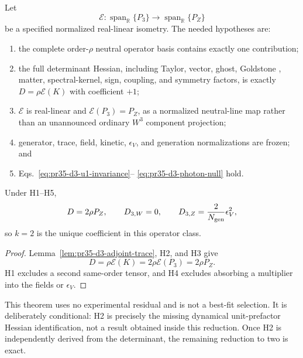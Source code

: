 Let
\begin{equation}
 \mathcal E:\operatorname{span}_{\mathbb R}\{P_3\}
 \longrightarrow\operatorname{span}_{\mathbb R}\{P_Z\}
\end{equation}
be a specified normalized real-linear isometry.  The needed hypotheses are:
\begin{enumerate}[label=\textnormal{H\arabic*.},leftmargin=2.8em]
 \item the complete order-$\rho$ neutral operator basis contains exactly one
 contribution;
 \item the full determinant Hessian, including Taylor, vector, ghost,
 Goldstone \cite{PeskinSchroeder_1995}, matter, spectral-kernel, sign, coupling, and symmetry factors, is
 exactly $D=\rho\mathcal E(K)$ with coefficient $+1$;
 \item $\mathcal E$ is real-linear and $\mathcal E(P_3)=P_Z$, as a normalized
 neutral-line map rather than an unannounced ordinary $W^3$ component
 projection;
 \item generator, trace, field, kinetic, $\epsilon_V$, and generation
 normalizations are frozen; and
 \item Eqs.~\eqref{eq:pr35-d3-u1-invariance}--
 \eqref{eq:pr35-d3-photon-null} hold.
\end{enumerate}

\begin{theorem}
\label{thm:pr35-d3-conditional-uniqueness}
Under H1--H5,
\begin{equation}
 D=2\rho P_Z,\qquad
 D_{3,W}=0,\qquad
 D_{3,Z}=\frac{2}{N_{\rm gen}}\epsilon_V^2,
 \label{eq:pr35-d3-unique-canonical-result}
\end{equation}
so $k=2$ is the unique coefficient in this operator class.
\end{theorem}

\begin{proof}
Lemma~\ref{lem:pr35-d3-adjoint-trace}, H2, and H3 give
\begin{equation}
 D=\rho\mathcal E(K)=2\rho\mathcal E(P_3)=2\rho P_Z.
\end{equation}
H1 excludes a second same-order tensor, and H4 excludes absorbing a multiplier
into the fields or $\epsilon_V$.
\end{proof}

This theorem uses no experimental residual and is not a best-fit selection.
It is deliberately conditional: H2 is precisely the missing dynamical
unit-prefactor Hessian identification, not a result obtained inside this
reduction.  Once H2 is independently derived from the determinant, the
remaining reduction to two is exact.

